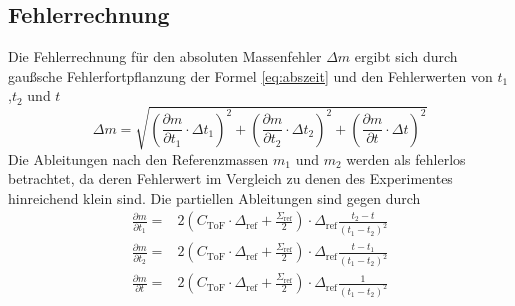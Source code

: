 \documentclass[numbers=noenddot,a4paper,notitlepage,twoside,BCOR15mm]{scrartcl}
\begin{document}
	\subsection{Fehlerrechnung}

	Die Fehlerrechnung für den absoluten Massenfehler $\Delta m$ ergibt sich durch gaußsche Fehlerfortpflanzung der Formel \autoref{eq:abszeit} und den Fehlerwerten von $t_1$,$t_2$ und $t$
	\begin{equation}
	\Delta m = \sqrt{\left(\frac{\partial m}{\partial t_1}\cdot \Delta t_1\right)^2+\left(\frac{\partial m}{\partial t_2}\cdot \Delta t_2\right)^2+\left(\frac{\partial m}{\partial t}\cdot \Delta t \right)^2}
	\end{equation}
	Die Ableitungen nach den Referenzmassen $m_1$ und $m_2$ werden als fehlerlos betrachtet, da deren Fehlerwert im Vergleich zu denen des Experimentes hinreichend klein sind. Die partiellen Ableitungen sind gegen durch
	\begin{align}
	\frac{\partial m}{\partial t_1} =& 2 \left(C_\mathrm{ToF}\cdot \Delta_\mathrm{ref}+\frac{\Sigma_\mathrm{ref}}{2}\right) \cdot \Delta_\mathrm{ref}\frac{t_2-t}{\left(t_1-t_2\right)^2} \nonumber \\
	\frac{\partial m}{\partial t_2} =& 2 \left(C_\mathrm{ToF}\cdot \Delta_\mathrm{ref}+\frac{\Sigma_\mathrm{ref}}{2}\right) \cdot \Delta_\mathrm{ref}\frac{t-t_1}{\left(t_1-t_2\right)^2} \\
	\frac{\partial m}{\partial t} =& 2 \left(C_\mathrm{ToF}\cdot \Delta_\mathrm{ref}+\frac{\Sigma_\mathrm{ref}}{2}\right) \cdot \Delta_\mathrm{ref}\frac{1}{\left(t_1-t_2\right)^2} \nonumber
	\end{align}

		
		
\end{document}
